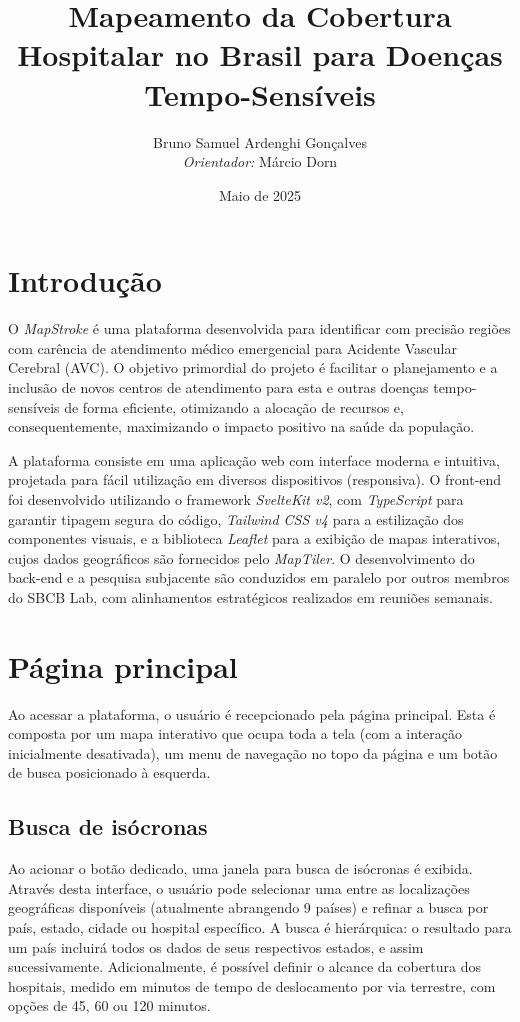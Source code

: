 \documentclass{article}
\title{Mapeamento da Cobertura Hospitalar no Brasil para Doenças Tempo-Sensíveis}
\author{
    Bruno Samuel Ardenghi Gonçalves \\
    \textit{Orientador:} Márcio Dorn
}
\date{\normalsize Maio de 2025}
\begin{document}
\maketitle

\section{Introdução}

\par O \textit{MapStroke} é uma plataforma desenvolvida para identificar com precisão regiões com carência de atendimento médico emergencial para Acidente Vascular Cerebral (AVC). O objetivo primordial do projeto é facilitar o planejamento e a inclusão de novos centros de atendimento para esta e outras doenças tempo-sensíveis de forma eficiente, otimizando a alocação de recursos e, consequentemente, maximizando o impacto positivo na saúde da população.

A plataforma consiste em uma aplicação web com interface moderna e intuitiva, projetada para fácil utilização em diversos dispositivos (responsiva). O front-end foi desenvolvido utilizando o framework \textit{SvelteKit v2}, com \textit{TypeScript} para garantir tipagem segura do código, \textit{Tailwind CSS v4} para a estilização dos componentes visuais, e a biblioteca \textit{Leaflet} para a exibição de mapas interativos, cujos dados geográficos são fornecidos pelo \textit{MapTiler}. O desenvolvimento do back-end e a pesquisa subjacente são conduzidos em paralelo por outros membros do SBCB Lab, com alinhamentos estratégicos realizados em reuniões semanais.

\section{Página principal}

Ao acessar a plataforma, o usuário é recepcionado pela página principal. Esta é composta por um mapa interativo que ocupa toda a tela (com a interação inicialmente desativada), um menu de navegação no topo da página e um botão de busca posicionado à esquerda.

\subsection{Busca de isócronas}

Ao acionar o botão dedicado, uma janela para busca de isócronas é exibida. Através desta interface, o usuário pode selecionar uma entre as localizações geográficas disponíveis (atualmente abrangendo 9 países) e refinar a busca por país, estado, cidade ou hospital específico. A busca é hierárquica: o resultado para um país incluirá todos os dados de seus respectivos estados, e assim sucessivamente. Adicionalmente, é possível definir o alcance da cobertura dos hospitais, medido em minutos de tempo de deslocamento por via terrestre, com opções de 45, 60 ou 120 minutos.
\end{document}
